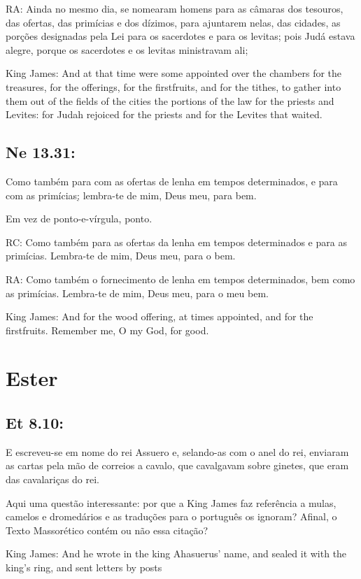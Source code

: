 RA: Ainda no mesmo dia, se nomearam homens para as câmaras dos tesouros, das ofertas, das primícias e dos dízimos, para ajuntarem nelas, das cidades, as porções designadas pela Lei para os sacerdotes e para os levitas; pois Judá estava alegre, porque os sacerdotes e os levitas ministravam ali;

King James: And at that time were some appointed over the chambers for the treasures, for the offerings, for the firstfruits, and for the tithes, to gather into them out of the fields of the cities the portions of the law for the priests and Levites: for Judah rejoiced for the priests and for the Levites that waited.

\subsection{Ne 13.31:}

 Como também para com as ofertas de lenha em tempos determinados, e para com as primícias\uline{;} lembra-te de mim, Deus meu, para bem.

Em vez de ponto-e-vírgula, ponto.

RC: Como também para as ofertas da lenha em tempos determinados e para as primícias. Lembra-te de mim, Deus meu, para o bem.

RA: Como também o fornecimento de lenha em tempos determinados, bem como as primícias. Lembra-te de mim, Deus meu, para o meu bem.

King James: And for the wood offering, at times appointed, and for the firstfruits. Remember me, O my God, for good.

\section{Ester}
\subsection{Et 8.10:}

 E escreveu-se em nome do rei Assuero e, selando-as com o anel do rei, enviaram as cartas pela mão de correios a cavalo, que cavalgavam sobre ginetes, que eram das cavalariças do rei.


Aqui uma questão interessante: por que a King James faz referência a
mulas, camelos e dromedários e as traduções para o português os
ignoram? Afinal, o Texto Massorético contém ou não essa citação?

King James: And he wrote in the king Ahasuerus’ name, and sealed it with the king’s ring, and sent letters by posts 

